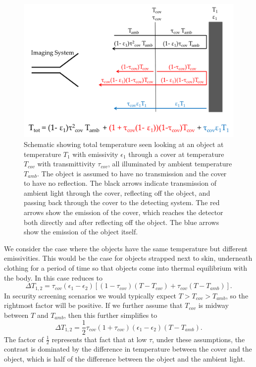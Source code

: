 \begin{figure}
\centering
\includegraphics[width=6in]{images/ch1-t-tot.png}
\caption[Apparent temperature of a covered illuminated object]{
  Schematic showing total temperature seen looking at an object at temperature $T_1$ with emissivity $\epsilon_1$ through a cover at temperature $T_{cov}$ with transmittivity $\tau_{cov}$, all illuminated by ambient temperature $T_{amb}$.
  The object is assumed to have no transmission and the cover to have no reflection.
  The black arrows indicate transmission of ambient light through the cover, reflecting off the object, and passing back through the cover to the detecting system.
  The red arrows show the emission of the cover, which reaches the detector both directly and after reflecting off the object.
  The blue arrows show the emission of the object itself.
}
\label{fig:ch1-t-tot}
\end{figure}

We consider the case where the objects have the same temperature but different emissivities.
This would be the case for objects strapped next to skin, underneath clothing for a period of time so that objects come into thermal equilibrium with the body.
In this case  reduces to
\begin{equation}
  \Delta T_{1,2} = \tau_{cov} (\epsilon_1 - \epsilon_2) \left[ (1 - \tau_{cov}) (T - T_{cov}) + \tau_{cov} (T - T_{amb}) \right].
\end{equation}
In security screening scenarios we would typically expect $T > T_{cov} > T_{amb}$, so the rightmost factor will be positive.
If we further assume that $T_{cov}$ is midway between $T$ and $T_{amb}$, then this further simplifies to
\begin{equation} \label{eqn:ch1-delta-t-simple}
  \Delta T_{1,2} = \frac{1}{2}\tau_{cov}(1+\tau_{cov}) (\epsilon_1 - \epsilon_2) (T - T_{amb}).
\end{equation}
The factor of $\frac{1}{2}$ represents that fact that at low $\tau$, under these assumptions, the contrast is dominated by the difference in temperature between the cover and the object, which is half of the difference between the object and the ambient light.

